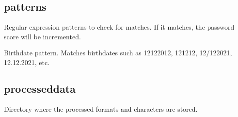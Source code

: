 \documentclass[letterpaper,10pt,english]{sphinxmanual}
\begin{document}
\subsection{patterns}
\label{\detokenize{usage:patterns}}
\sphinxAtStartPar
Regular expression patterns to check for matches. If it matches, the password score will be incremented.

\begin{fulllineitems}
\label{\detokenize{usage:birthdate}}
\sphinxAtStartPar
Birthdate pattern. Matches birthdates such as 12\sphinxhyphen{}12\sphinxhyphen{}2012, 12\sphinxhyphen{}12\sphinxhyphen{}12, 12/12\sphinxhyphen{}2021, 12.12.2021, etc.

\begin{sphinxVerbatim}[commandchars=\\\{\}]
  \PYG{l+s+s1}{(.*)[}\PYG{l+s+s1}{d]+(}\PYG{l+s+s1}{\PYGZus{})[}\PYG{l+s+s1}{d]+(}\PYG{l+s+s1}{\PYGZus{})[}\PYG{l+s+s1}{d]+(.*)}
\end{sphinxVerbatim}

\end{fulllineitems}



\subsection{processed\sphinxhyphen{}data}
\label{\detokenize{usage:processed-data}}

\begin{fulllineitems}
\sphinxAtStartPar
Directory where the processed formats and characters are stored.

\begin{sphinxVerbatim}[commandchars=\\\{\}]
  
\end{sphinxVerbatim}

\end{fulllineitems}
\end{document}
